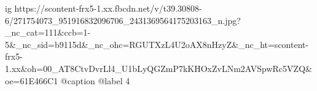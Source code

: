  
 
 
 
 

\ifcmt
  ig https://scontent-frx5-1.xx.fbcdn.net/v/t39.30808-6/271754073_951916832096706_2431369564175203163_n.jpg?_nc_cat=111&ccb=1-5&_nc_sid=b9115d&_nc_ohc=RGUTXzL4U2oAX8nHzyZ&_nc_ht=scontent-frx5-1.xx&oh=00_AT8CtvDvrLl4_U1bLyQGZmP7kKHOxZvLNm2AVSpwRc5VZQ&oe=61E466C1
  @caption @label 4
\fi
